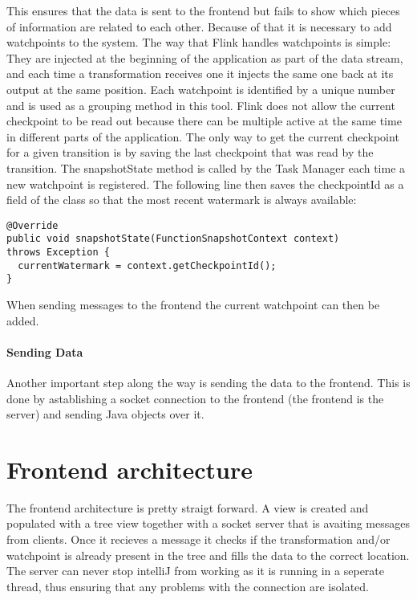 This ensures that the data is sent to the frontend but fails to show which pieces of information are related to each other. Because of that it is necessary to add watchpoints to the system. The way that Flink handles watchpoints is simple: They are injected at the beginning of the application as part of the data stream, and each time a transformation receives one it injects the same one back at its output at the same position. Each watchpoint is identified by a unique number and is used as a grouping method in this tool. Flink does not allow the current checkpoint to be read out because there can be multiple active at the same time in different parts of the application. The only way to get the current checkpoint for a given transition is by saving the last checkpoint that was read by the transition. The snapshotState method is called by the Task Manager each time a new watchpoint is registered. The following line then saves the checkpointId as a field of the class so that the most recent watermark is always available:

\begin{lstlisting}[caption={Save Watermark}]
@Override
public void snapshotState(FunctionSnapshotContext context)
throws Exception {
  currentWatermark = context.getCheckpointId();
}
\end{lstlisting}

When sending messages to the frontend the current watchpoint can then be added.

\paragraph{Sending Data}

Another important step along the way is sending the data to the frontend. This is done by astablishing a socket connection to the frontend (the frontend is the server) and sending Java objects over it.

\section{Frontend architecture}
\label{fbFrontend}
The frontend architecture is pretty straigt forward. A view is created and populated with a tree view together with a socket server that is avaiting messages from clients. Once it recieves a message it checks if the transformation and/or watchpoint is already present in the tree and fills the data to the correct location. The server can never stop intelliJ from working as it is running in a seperate thread, thus ensuring that any problems with the connection are isolated.


